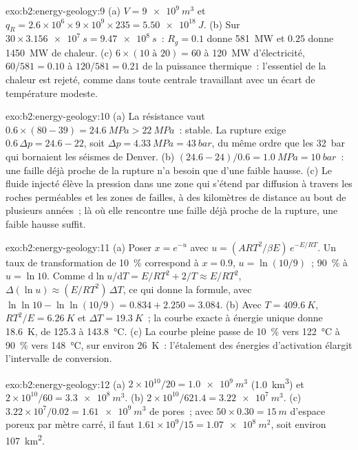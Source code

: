 \begin{solution}{exo:b2:energy-geology:9}
(a) $V = \qty{9e9}{m^3}$ et $q_R = 2.6 \times 10^6 \times 9 \times 10^9 \times 235 =
\qty{5.50e18}{J}$. (b) Sur $30 \times \qty{3.156e7}{s} = \qty{9.47e8}{s}$~: $R_g = 0.1$ donne
\qty{581}{MW} et $0.25$ donne \qty{1450}{MW} de chaleur. (c) $6 \times (10 \text{ à } 20) = 60$ à
\qty{120}{MW} d'électricité, $60/581 = 0.10$ à $120/581 = 0.21$ de la puissance thermique~: l'essentiel de la
chaleur est rejeté, comme dans toute centrale travaillant avec un écart de température modeste.
\end{solution}

\begin{solution}{exo:b2:energy-geology:10}
(a) La résistance vaut $0.6 \times (80 - 39) = \qty{24.6}{MPa} > \qty{22}{MPa}$~: stable. La rupture exige
$0.6\,\Delta p = 24.6 - 22$, soit $\Delta p = \qty{4.33}{MPa} = \qty{43}{bar}$, du même ordre que les
\qty{32}{bar} qui bornaient les séismes de Denver. (b) $(24.6 - 24)/0.6 = \qty{1.0}{MPa} =
\qty{10}{bar}$~: une faille déjà proche de la rupture n'a besoin que d'une faible hausse. (c) Le fluide injecté élève la
pression dans une zone qui s'étend par diffusion à travers les roches perméables et les zones de failles, à des kilomètres
de distance au bout de plusieurs années~; là où elle rencontre une faille déjà proche de la rupture, une faible hausse suffit.
\end{solution}

\begin{solution}{exo:b2:energy-geology:11}
(a) Poser $x = e^{-u}$ avec $u = (ART^2/\beta E)\,e^{-E/RT}$. Un taux de transformation de
\qty{10}{\percent} correspond à $x = 0.9$, $u = \ln(10/9)$~; \qty{90}{\percent} à $u = \ln 10$. Comme
$\mathrm{d}\ln u/\mathrm{d}T = E/RT^2 + 2/T \approx E/RT^2$, $\Delta(\ln u) \approx (E/RT^2)\,\Delta T$,
ce qui donne la formule, avec $\ln\ln 10 - \ln\ln(10/9) = 0.834 + 2.250 = 3.084$. (b) Avec $T =
\qty{409.6}{K}$, $RT^2/E = \qty{6.26}{K}$ et $\Delta T = \qty{19.3}{K}$~;
la courbe exacte à énergie unique donne \qty{18.6}{K}, de 125.3 à \qty{143.8}{\celsius}. (c) La courbe pleine passe de
\qty{10}{\percent} vers \qty{122}{\celsius} à \qty{90}{\percent} vers \qty{148}{\celsius}, sur environ
\qty{26}{K}~: l'étalement des énergies d'activation élargit l'intervalle de conversion.
\end{solution}

\begin{solution}{exo:b2:energy-geology:12}
(a) $2 \times 10^{10}/20 = \qty{1.0e9}{m^3}$ (\qty{1.0}{km^3}) et $2 \times 10^{10}/60 =
\qty{3.3e8}{m^3}$. (b) $2 \times 10^{10}/621.4 = \qty{3.22e7}{m^3}$. (c) $3.22 \times 10^7/0.02 =
\qty{1.61e9}{m^3}$ de pores~; avec $50 \times 0.30 = \qty{15}{m}$ d'espace poreux par mètre carré, il faut
$1.61 \times 10^9/15 = \qty{1.07e8}{m^2}$, soit environ \qty{107}{km^2}.
\end{solution}

